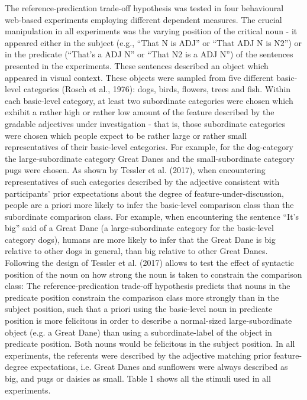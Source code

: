 The reference-predication trade-off hypothesis was tested in four behavioural web-based experiments employing different dependent measures. The crucial manipulation in all experiments was the varying position of the critical noun - it appeared either in the subject (e.g., “That N is ADJ” or “That ADJ N is N2”) or in the predicate (“That’s a ADJ N” or “That N2 is a ADJ N”) of the sentences presented in the experiments. These sentences described an object which appeared in visual context. 
These objects were sampled from five different basic-level categories (Rosch et al., 1976): dogs, birds, flowers, trees and fish. Within each basic-level category, at least two subordinate categories were chosen which exhibit a rather high or rather low amount of the feature described by the gradable adjectives under investigation - that is, those subordinate categories were chosen which people expect to be rather large or rather small representatives of their basic-level categories. For example, for the dog-category the large-subordinate category Great Danes and the small-subordinate category pugs were chosen. As shown by Tessler et al. (2017), when encountering representatives of such categories described by the adjective consistent with participants’ prior expectations about the degree of feature-under-discussion, people are a priori more likely to infer the basic-level comparison class than the subordinate comparison class. For example, when encountering the sentence “It’s big” said of a Great Dane (a large-subordinate category for the basic-level category dogs), humans are more likely to infer that the Great Dane is big relative to other dogs in general, than big relative to other Great Danes.  
Following the design of Tessler et al. (2017) allows to test the effect of syntactic position of the noun on how strong the noun is taken to constrain the comparison class: The reference-predication trade-off hypothesis predicts that nouns in the predicate position constrain the comparison class more strongly than in the subject position, such that a priori using the basic-level noun in predicate position is more felicitous in order to describe a normal-sized large-subordinate object (e.g. a Great Dane) than using a subordinate-label of the object in predicate position. Both nouns would be felicitous in the subject position. In all experiments, the referents were described by the adjective matching prior feature-degree expectations, i.e. Great Danes and sunflowers were always described as big, and pugs or daisies as small. Table 1 shows all the stimuli used in all experiments. 

